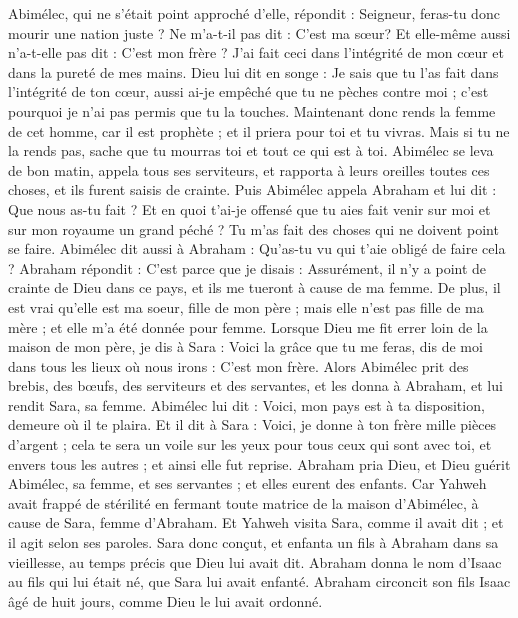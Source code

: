 \begin{multicols}{2}
Abimélec, qui ne s'était point approché d'elle, répondit : Seigneur, feras-tu donc mourir une nation juste ?
Ne m'a-t-il pas dit : C'est ma sœur? Et elle-même aussi n'a-t-elle pas dit : C'est mon frère ? J'ai fait ceci dans l'intégrité de mon cœur et dans la pureté de mes mains.
Dieu lui dit en songe : Je sais que tu l'as fait dans l'intégrité de ton cœur, aussi ai-je empêché que tu ne pèches contre moi ; c'est pourquoi je n'ai pas permis que tu la touches.
Maintenant donc rends la femme de cet homme, car il est prophète ; et il priera pour toi et tu vivras. Mais si tu ne la rends pas, sache que tu mourras toi et tout ce qui est à toi.
Abimélec se leva de bon matin, appela tous ses serviteurs, et rapporta à leurs oreilles  toutes ces choses, et ils furent saisis de crainte.
Puis Abimélec appela Abraham et lui dit : Que nous as-tu fait ? Et en quoi t'ai-je offensé que tu aies fait venir sur moi et sur mon royaume un grand péché ? Tu m'as fait des choses qui ne doivent point se faire.
Abimélec dit aussi à Abraham : Qu'as-tu vu qui t'aie obligé de faire cela ?
Abraham répondit : C'est parce que je disais : Assurément, il n'y a point de crainte de Dieu dans ce pays, et ils me tueront à cause de ma femme.
De plus, il est vrai qu’elle est ma soeur, fille de mon père ; mais elle n'est pas fille de ma mère ; et elle m'a été donnée pour femme.
Lorsque Dieu me fit errer loin de la maison de mon père, je dis à Sara : Voici la grâce que tu me feras, dis de moi dans tous les lieux où nous irons : C'est mon frère.
Alors Abimélec prit des brebis, des bœufs, des serviteurs et des servantes, et les donna à Abraham, et lui rendit Sara, sa femme.
Abimélec lui dit : Voici, mon pays est à ta disposition, demeure où il te plaira.
Et il dit à Sara : Voici, je donne à ton frère mille pièces d'argent ; cela te sera un voile sur les yeux  pour tous ceux qui sont avec toi, et envers tous les autres ; et ainsi elle fut reprise.
Abraham pria Dieu, et Dieu guérit Abimélec, sa femme, et ses servantes ; et elles eurent des enfants.
Car Yahweh avait frappé de stérilité en  fermant toute matrice de la maison d'Abimélec, à cause de Sara, femme d'Abraham.
\VerseOne{}Et Yahweh visita Sara, comme il avait dit ; et il agit selon ses paroles.
Sara donc conçut, et enfanta un fils à Abraham dans sa vieillesse, au temps précis que Dieu lui avait dit.
Abraham donna le nom d’Isaac au fils qui lui était né, que Sara lui avait enfanté.
Abraham circoncit son fils Isaac âgé de huit jours, comme Dieu le lui avait ordonné.

\end{multicols}
